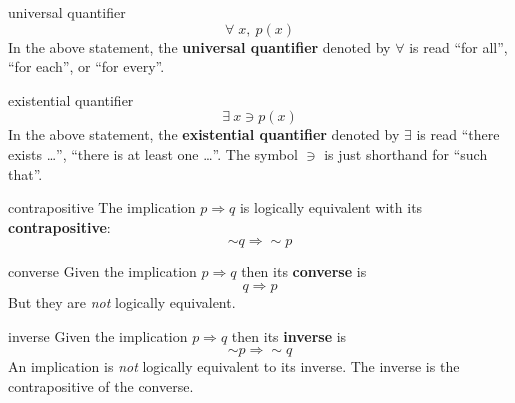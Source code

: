 \documentclass[avery5371,grid]{flashcards}
\begin{document}

\begin{flashcard}[Definition]{universal quantifier}
\begin{equation*}
\forall \; x, \ p(x)
\end{equation*}
In the above statement, the \textbf{universal quantifier} denoted by
$\forall$ is read ``for all'', ``for each'', or ``for every''.
\end{flashcard}

\begin{flashcard}[Definition]{existential quantifier}
\begin{equation*}
\exists \ x \ni p(x)
\end{equation*}
In the above statement, the \textbf{existential quantifier} denoted by
$\exists$ is read ``there exists \ldots'', ``there is at least one
\ldots''.  The symbol $\ni$ is just shorthand for ``such that''.
\end{flashcard}


\begin{flashcard}[Definition]{contrapositive}
The implication $p \Rightarrow q$ is logically equivalent with its
\mbox{\textbf{contrapositive}}:
\begin{equation*}
\sim q \Rightarrow \sim p
\end{equation*}
\end{flashcard}

\begin{flashcard}[Definition]{converse}
Given the implication $p \Rightarrow q$ then its
\mbox{\textbf{converse}} is
\begin{equation*}
q \Rightarrow p
\end{equation*}
But they are \textit{not} logically equivalent.
\end{flashcard}

\begin{flashcard}[Definition]{inverse}
Given the implication $p \Rightarrow q$ then its
\mbox{\textbf{inverse}} is
\begin{equation*}
\sim p \Rightarrow \sim q
\end{equation*}
An implication is \textit{not} logically equivalent to its inverse.
The inverse is the contrapositive of the converse.

\end{flashcard}
\end{document}
